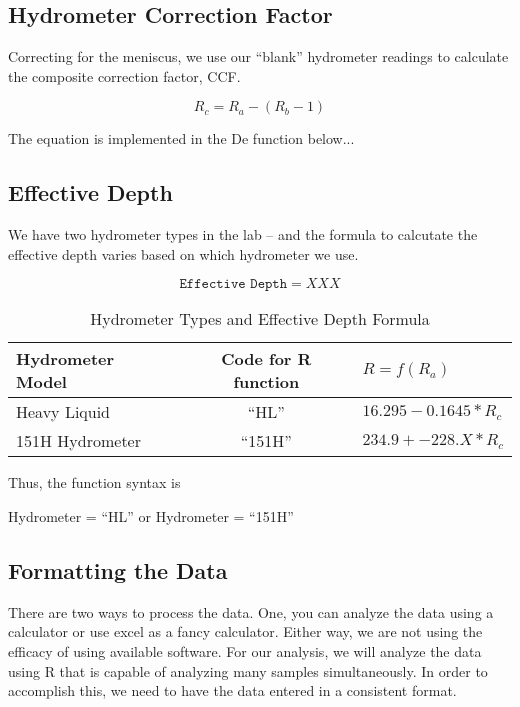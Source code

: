 \subsection{Hydrometer Correction Factor}

Correcting for the meniscus, we use our ``blank'' hydrometer readings to calculate the composite correction factor, CCF. 

\begin{equation}
R_c = R_a - (R_b - 1)
\end{equation}

The equation is implemented in the De function below...



\subsection{Effective Depth}

We have two hydrometer types in the lab -- and the formula to calcutate the effective depth varies based on which hydrometer we use. 

\begin{equation}
\texttt{Effective Depth} = XXX
\end{equation}

\begin{table}
		\begin{tabular}{lcl}\hline
Hydrometer Model	& Code for R function  	&	$R = f(R_a)$	\\ \hline\hline
Heavy Liquid			&		``HL''							&	$16.295 - 0.1645 * R_c$\\
151H Hydrometer		& 	``151H''						& $234.9 + -228.X * R_c$\\ \hline
		\end{tabular}
	\caption{Hydrometer Types and Effective Depth Formula}
	\label{tab:HydrometerTypesAndEffectiveDepthFormula}
\end{table}

Thus, the function syntax is

Hydrometer = ``HL'' or Hydrometer = ``151H''

\subsection{Formatting the Data}

There are two ways to process the data. One, you can analyze the data using a calculator or use excel as a fancy calculator. Either way, we are not using the efficacy of using available software. For our analysis, we will analyze the data using R that is capable of analyzing many samples simultaneously. In order to accomplish this, we need to have the data entered in a consistent format. 

